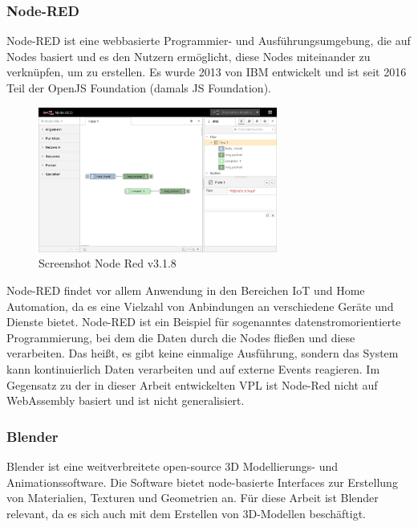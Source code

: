 \documentclass[ngerman]{article}
\begin{document}
\subsubsection{Node-RED}

Node-RED ist eine webbasierte Programmier- und Ausführungsumgebung, die auf Nodes basiert und es den Nutzern ermöglicht, diese Nodes miteinander zu verknüpfen, um  zu erstellen. 
Es wurde 2013 von IBM entwickelt und ist seit 2016 Teil der OpenJS Foundation (damals JS Foundation).
\cite{nodered}

\begin{figure}[htbp]
  \centering
  \includegraphics[width=0.7\textwidth]{./graphics/node-red-3_1_8.png}
  \caption{Screenshot Node Red v3.1.8}
  \label{fig:node_red}
\end{figure}

Node-RED findet vor allem Anwendung in den Bereichen IoT und Home Automation, da es eine Vielzahl von Anbindungen an verschiedene Geräte und Dienste bietet. 
Node-RED ist ein Beispiel für sogenanntes datenstromorientierte Programmierung, bei dem die Daten durch die Nodes fließen und diese verarbeiten. Das heißt, es gibt keine einmalige Ausführung, sondern das System kann kontinuierlich Daten verarbeiten und auf externe Events reagieren. Im Gegensatz zu der in dieser Arbeit entwickelten VPL ist Node-Red nicht auf WebAssembly basiert und ist nicht generalisiert.


\pagebreak
\subsubsection{Blender}
Blender ist eine weitverbreitete open-source 3D Modellierungs- und Animationssoftware. Die Software bietet node-basierte Interfaces zur Erstellung von Materialien, Texturen und Geometrien an. 
\cite{blender}
Für diese Arbeit ist Blender relevant, da es sich auch mit dem Erstellen von 3D-Modellen beschäftigt.
\end{document}
